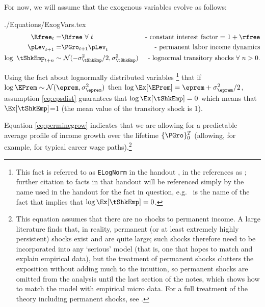 \documentclass[titlepage]{\econtex}
\begin{document}
For now, we will assume that the exogenous variables evolve as follows: 
\begin{verbatimwrite}{./Equations/ExogVars.tex}
\begin{eqnarray}
   \Rfree_{t}   = & \Rfree~\forall~t & \text{- constant interest factor = $1+\rfree$}  \notag
\\ \pLev_{t+1}  = & \PGro_{t+1}\pLev_{t} &   \text{- permanent labor income dynamics} \label{eq:permincgrow} 
\\ \log ~ \tShkEmp_{t+n} \sim &  ~\mathcal{N}(-\sigma_{\tShkEmp}^{2}/2,\sigma_{\tShkEmp}^{2}) & \text{- lognormal transitory shocks}~\forall~n>0 \notag
\label{eq:epsdist}
.
\end{eqnarray}
\end{verbatimwrite}


Using the fact about lognormally distributed variables \footnote{This fact is referred to as \texttt{ELogNorm}
in the handout , in the references as \cite{MathFacts};
further citation to facts in that handout will be referenced simply by
the name used in the handout for the fact in question, e.g.\
 is the name of the fact that implies that $\log \Ex[{\tShkEmp}]=0$.} that if $\log \EPrem \sim
\mathcal{N}(\eprem,\sigma_{\eprem}^{2})$ then $\log \Ex[{\EPrem}] =
\eprem +\sigma_{\eprem}^{2}/2$, assumption \eqref{eq:epsdist} guarantees that $\log \Ex[{\tShkEmp}] = 0$ which means that
$\Ex[{\tShkEmp}]$=1 (the mean value of the transitory shock is 1).

Equation \eqref{eq:permincgrow} indicates that we are allowing
for a predictable average profile of income growth over the lifetime $\{\PGro\}_{0}^{T}$ 
(allowing, for example, for typical career wage
paths).\footnote{This equation assumes that there are no shocks to
  permanent income.  A large literature finds that, in reality,
  permanent (or at least extremely highly persistent) shocks exist and are quite large; such shocks therefore
  need to be incorporated into any `serious' model (that is, one that
  hopes to match and explain empirical data), but the treatment of
  permanent shocks clutters the exposition without adding much to the
  intuition, so permanent shocks are omitted from the analysis
  until the last section of the notes, which shows how to match the
  model with empirical micro data.  For a full treatment of the
  theory including permanent shocks, see \cite{BufferStockTheory}.}
\end{document}
